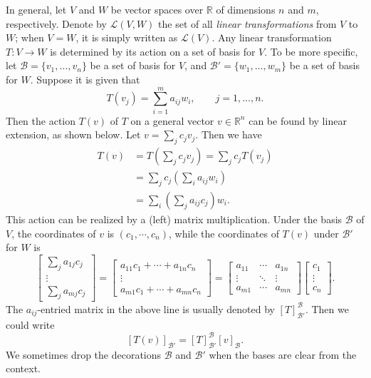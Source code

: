\documentclass[11pt]{article}
\begin{document}
In general, let $V$ and $W$ be vector spaces over $\mathbb{R}$ of dimensions $n$ and $m$, respectively.
Denote by $\mathcal{L}(V,W)$ the set of all \textit{linear transformations} from $V$ to $W$; when $V = W$, it is simply written as $\mathcal{L}(V)$.
Any linear transformation $T: V \to W$ is determined by its action on a set of basis for $V$.
To be more specific, let $\mathcal{B} = \{ v_1, \dots, v_n \}$ be a set of basis for $V$, and $\mathcal{B}' = \{ w_1, \dots, w_m \}$ be a set of basis for $W$.
Suppose it is given that
\[
  T(v_j) = \sum_{i=1}^m a_{ij} w_i, \qquad j = 1, \dots, n.
\]
Then the action $T(v)$ of $T$ on a general vector $v \in \mathbb{R}^n$ can be found by linear extension, as shown below.  Let $v = \sum_j c_j v_j$.  Then we have
\begin{align*}
  T(v) &= T \left( \sum_j c_j v_j \right) = \sum_j c_j T(v_j) \\
  &= \sum_j c_j \left( \sum_i a_{ij} w_i \right) \\
  &= \sum_i \left( \sum_j a_{ij} c_j \right) w_i.
\end{align*}
This action can be realized by a (left) matrix multiplication.
Under the basis $\mathcal{B}$ of $V$, the coordinates of $v$ is $(c_1, \cdots, c_n)$, while the coordinates of $T(v)$ under $\mathcal{B}'$ for $W$ is
\[
  \begin{bmatrix}
    \sum_j a_{1j} c_j \\ \vdots \\ \sum_j a_{mj} c_j
  \end{bmatrix} = 
  \begin{bmatrix}
    a_{11} c_1 + \cdots + a_{1n} c_n \\
    \vdots \\ a_{m1} c_1 + \cdots + a_{mn} c_n
  \end{bmatrix} =
  \begin{bmatrix}
    a_{11} & \cdots & a_{1n} \\ \vdots & \ddots & \vdots \\ a_{m1} & \cdots & a_{mn}
  \end{bmatrix}
  \begin{bmatrix}
    c_1 \\ \vdots \\ c_n
  \end{bmatrix}.
\]
The $a_{ij}$-entried matrix in the above line is usually denoted by $[T]_{\mathcal{B}'}^{\mathcal{B}}$.
Then we could write
\[
  [T(v)]_{\mathcal{B}'} = [T]_{\mathcal{B}'}^{\mathcal{B}} [v]_{\mathcal{B}}.
\]
We sometimes drop the decorations $\mathcal{B}$ and $\mathcal{B}'$ when the bases are clear from the context.
\end{document}
